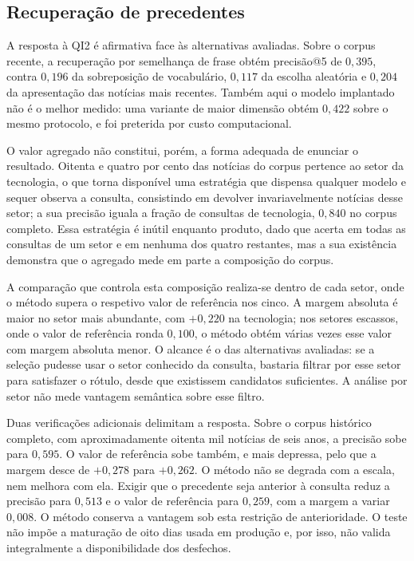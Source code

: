 \subsection{Recuperação de precedentes}
\label{sec:con_qi2}

A resposta à \gls{QI}2 é afirmativa face às alternativas avaliadas. Sobre o corpus
recente, a recuperação por semelhança de frase \autocite{reimers2019sbert} obtém precisão@5 de
$0{,}395$, contra $0{,}196$ da sobreposição de vocabulário, $0{,}117$ da escolha aleatória e
$0{,}204$ da apresentação das notícias mais recentes. Também aqui o modelo implantado não é o melhor
medido: uma variante de maior dimensão obtém $0{,}422$ sobre o mesmo protocolo, e foi preterida por
custo computacional.

O valor agregado não constitui, porém, a forma adequada de enunciar o resultado. Oitenta e quatro por cento das
notícias do corpus pertence ao setor da tecnologia, o que torna disponível uma estratégia que
dispensa qualquer modelo e sequer observa a consulta, consistindo em devolver invariavelmente
notícias desse setor; a sua precisão iguala a fração de consultas de tecnologia, $0{,}840$ no corpus completo. Essa
estratégia é inútil enquanto produto, dado que acerta em todas as consultas de um setor e em nenhuma
dos quatro restantes, mas a sua existência demonstra que o agregado mede em parte a composição do
corpus.

A comparação que controla esta composição realiza-se dentro de cada setor, onde o método supera o
respetivo valor de referência nos cinco. A margem absoluta é maior no setor mais abundante, com
$+0{,}220$ na tecnologia; nos setores escassos, onde o valor de referência ronda $0{,}100$, o método
obtém várias vezes esse valor com margem absoluta menor. O alcance é o das alternativas avaliadas:
se a seleção pudesse usar o setor conhecido da consulta, bastaria filtrar por esse setor para
satisfazer o rótulo, desde que existissem candidatos suficientes. A análise por setor não mede
vantagem semântica sobre esse filtro.

Duas verificações adicionais delimitam a resposta. Sobre o corpus histórico completo, com aproximadamente oitenta mil notícias de seis anos, a
precisão sobe para $0{,}595$. O valor de referência sobe também, e mais depressa, pelo que a
margem desce de $+0{,}278$ para $+0{,}262$.
O método não se degrada com a escala, nem melhora com ela. Exigir que o precedente seja anterior
à consulta reduz a precisão
para $0{,}513$ e o valor de referência para $0{,}259$, com a margem a variar $0{,}008$. O método
conserva a vantagem sob esta restrição de anterioridade. O teste não impõe a maturação de oito
dias usada em produção e, por isso, não valida integralmente a disponibilidade dos desfechos.

